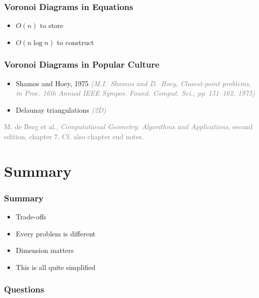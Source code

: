 \documentclass{beamer}
\newcommand\gray[1]{\textcolor{gray}{#1}}
\newcommand\smallgray[1]{\textcolor{gray}{\small\it #1}}
\begin{document}
\begin{frame}
  \frametitle{Voronoi Diagrams in Equations}

  \begin{itemize}
  \item $O(n)$ to store
  \item $O(n\log n)$ to construct
  \end{itemize}
\end{frame}

\begin{frame}
  \frametitle{Voronoi Diagrams in Popular Culture}

  \begin{itemize}
  \item Shamos and Hoey, 1975 \smallgray{(M.I.~Shamos and D.~Hoey,
      Closest-point problems, in Proc. 16th Annual IEEE
      Sympos. Found. Comput. Sci., pp~151--162, 1975)}
  \item Delaunay triangulations \smallgray{(2D)}
  \end{itemize}

  \bigskip \gray{ 
    M. de Berg et al., \textit{Computational Geometry: Algorithms and
      Applications}, second edition, chapter 7.  Cf. also chapter end
    notes.}  

\end{frame}

\section*{Summary}

\begin{frame}
  \frametitle{Summary}  

  \begin{itemize}
  \item Trade-offs
  \item Every problem is different
  \item Dimension matters
  \item This is all quite simplified
  \end{itemize}
\end{frame}

\begin{frame}
  \frametitle{Questions}  
\end{frame}
\end{document}
